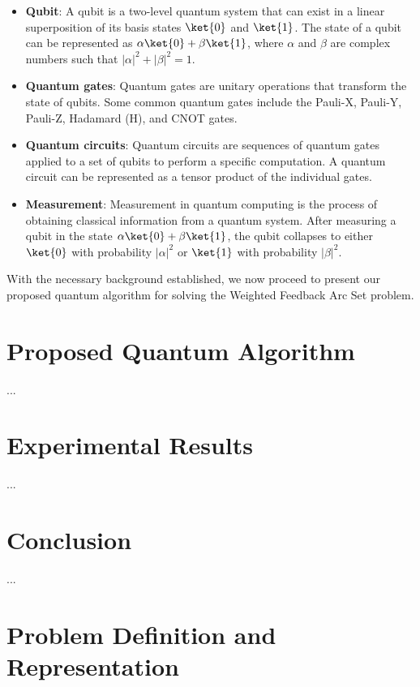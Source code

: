 \begin{itemize}
    \item \textbf{Qubit}: A qubit is a two-level quantum system that can exist in a linear superposition of its basis states $\ket{0}$ and $\ket{1}$. The state of a qubit can be represented as $\alpha\ket{0} + \beta\ket{1}$, where $\alpha$ and $\beta$ are complex numbers such that $|\alpha|^2 + |\beta|^2 = 1$.
    
    \item \textbf{Quantum gates}: Quantum gates are unitary operations that transform the state of qubits. Some common quantum gates include the Pauli-X, Pauli-Y, Pauli-Z, Hadamard (H), and CNOT gates.
    
    \item \textbf{Quantum circuits}: Quantum circuits are sequences of quantum gates applied to a set of qubits to perform a specific computation. A quantum circuit can be represented as a tensor product of the individual gates.
    
    \item \textbf{Measurement}: Measurement in quantum computing is the process of obtaining classical information from a quantum system. After measuring a qubit in the state $\alpha\ket{0} + \beta\ket{1}$, the qubit collapses to either $\ket{0}$ with probability $|\alpha|^2$ or $\ket{1}$ with probability $|\beta|^2$.
\end{itemize}

With the necessary background established, we now proceed to present our proposed quantum algorithm for solving the Weighted Feedback Arc Set problem.


\section{Proposed Quantum Algorithm} \label{sec:algorithm}
...
\section{Experimental Results} \label{sec:results}
...
\section{Conclusion} \label{sec:conclusion}
...




\section{Problem Definition and Representation}

